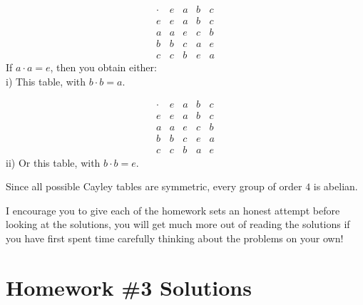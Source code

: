 \begin{enumerate}
    \begin{center}
        \begin{minipage}{0.45\textwidth}
            \centering
            \[
            \begin{array}{c||cccc}
                \cdot & e & a & b & c \\
                \hline \hline
                e & e & a & b & c \\
                a & a & e & c & b \\
                b & b & c & a & e \\
                c & c & b & e & a
            \end{array}
            \]
            If $a \cdot a = e$, then you obtain either:\\
            i) This table, with $b \cdot b = a$.
        \end{minipage}
        \hfill
        \begin{minipage}{0.45\textwidth}
            \centering
            \[
            \begin{array}{c||cccc}
                \cdot & e & a & b & c \\
                \hline \hline
                e & e & a & b & c \\
                a & a & e & c & b \\
                b & b & c & e & a \\
                c & c & b & a & e
            \end{array}
            \]
            ii) Or this table, with $b \cdot b = e$.
        \end{minipage}
    \end{center}

    Since all possible Cayley tables are symmetric, every group of order $4$ is abelian.
\end{enumerate}

\newpage
\begin{tcolorbox}
    I encourage you to give each of the homework sets an honest attempt before looking at the solutions, you will get much more out of reading the solutions if you have first spent time carefully thinking about the problems on your own!
\end{tcolorbox}
\vspace{-0.2in}
\section{Homework \#3 Solutions}